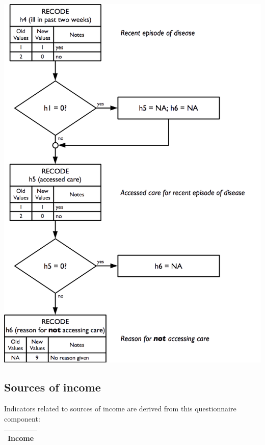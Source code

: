 \documentclass[12pt,a4paper]{book}
\theoremstyle{definition}
\theoremstyle{definition}
\theoremstyle{definition}
\theoremstyle{remark}
\begin{document}
\begin{center}\includegraphics[width=800pt]{figures/indicators22} \end{center}

\hypertarget{sources-of-income}{%
\subsection{Sources of income}\label{sources-of-income}}

Indicators related to sources of income are derived from this
questionnaire component:

\begin{longtable}[]{@{}c@{}}
\toprule
\begin{minipage}[t]{0.97\columnwidth}\centering
\textbf{Income}\strut
\end{minipage}\tabularnewline
\bottomrule
\end{longtable}
\end{document}
